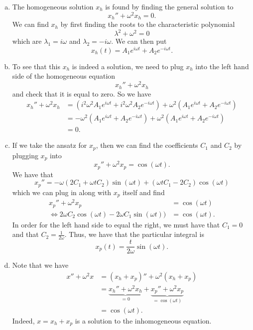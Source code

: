 \documentclass[12pt]{amsbook}
\begin{document}
\begin{solution}
\begin{enumerate}[(a)]
    \item The homogeneous solution $x_h$ is found by finding the general solution to
    \[
    x_h''+\omega^2 x_h = 0.
    \]
    We can find $x_h$ by first finding the roots to the characteristic polynomial
    \[
    \lambda^2 + \omega^2=0
    \]
    which are $\lambda_1 = i\omega$ and $\lambda_2=-i\omega$.  We can then put
    \[
    \boxed{x_h(t)=A_1 e^{i\omega t}+A_2 e^{-i\omega t}.}
    \]
    \item To see that this $x_h$ is indeed a solution, we need to plug $x_h$ into the left hand side of the homogeneous equation
    \[
    x_h''+ \omega^2 x_h
    \]
    and check that it is equal to zero.  So we have
    \begin{align*}
        x_h''+\omega^2x_h &= \left(i^2\omega^2 A_1 e^{i\omega t}+i^2\omega^2 A_2 e^{-i\omega t}\right) + \omega^2 \left( A_1 e^{i\omega t}+A_2 e^{-i\omega t}\right)\\
        &= -\omega^2\left(A_1 e^{i\omega t}+A_2e^{-i\omega t}\right)+\omega^2\left(A_1 e^{i\omega t}+A_2e^{-i\omega t}\right)\\
        &=0.
    \end{align*}
    \item If we take the ansatz for $x_p$, then we can find the coefficients $C_1$ and $C_2$ by plugging $x_p$ into
    \[
    x_p''+\omega^2x_p=\cos(\omega t).
    \]
    We have that
    \[
    x_p''= -\omega(2C_1+\omega tC_2)\sin(\omega t)+(\omega t C_1 - 2 C_2)\cos(\omega t)
    \]
    which we can plug in along with $x_p$ itself and find
    \begin{align*}
        x_p''+\omega^2x_p&=\cos(\omega t)\\
        \iff 2\omega C_2 \cos(\omega t)-2\omega C_1\sin(\omega t))&=\cos(\omega t).
    \end{align*}
    In order for the left hand side to equal the right, we must have that $C_1=0$ and that $C_2=\frac{1}{2\omega}$.  Thus, we have that the particular integral is
    \[
    \boxed{x_p(t)=\frac{t}{2\omega}\sin(\omega t).}
    \]
    \item Note that we have
    \begin{align*}
        x''+\omega^2x&= (x_h+x_p)''+\omega^2(x_h+x_p)\\
        &= \underbrace{x_h''+\omega^2 x_h}_{=0} + \underbrace{x_p''+\omega^2 x_p}_{=\cos(\omega t)}\\
        &= \cos(\omega t).
    \end{align*}
    Indeed, $x=x_h+x_p$ is a solution to the inhomogeneous equation.
\end{enumerate}
\end{solution}
\end{document}
